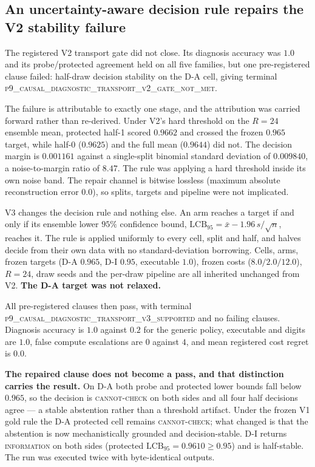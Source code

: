 \subsection{An uncertainty-aware decision rule repairs the V2 stability failure}
\label{sec:v3-transport}

The registered V2 transport gate did not close. Its diagnosis accuracy was
$1.0$ and its probe/protected agreement held on all five families, but one
pre-registered clause failed: half-draw decision stability on the D-A cell,
giving terminal \textsc{p9\_causal\_diagnostic\_transport\_v2\_gate\_not\_met}.

The failure is attributable to exactly one stage, and the attribution was carried
forward rather than re-derived. Under V2's hard threshold on the $R{=}24$ ensemble
mean, protected half-1 scored $0.9662$ and crossed the frozen $0.965$ target, while
half-0 ($0.9625$) and the full mean ($0.9644$) did not. The decision margin is
$0.001161$ against a single-split binomial standard deviation of $0.009840$, a
noise-to-margin ratio of $8.47$. The rule was applying a hard threshold inside its
own noise band. The repair channel is bitwise lossless (maximum absolute
reconstruction error $0.0$), so splits, targets and pipeline were not implicated.

V3 changes the decision rule and nothing else. An arm reaches a target if and only
if its ensemble lower $95\%$ confidence bound,
$\mathrm{LCB}_{95} = \bar{x} - 1.96\,s/\sqrt{n}$, reaches it. The rule is applied
uniformly to every cell, split and half, and halves decide from their own data with
no standard-deviation borrowing. Cells, arms, frozen targets (D-A $0.965$, D-I
$0.95$, executable $1.0$), frozen costs ($8.0/2.0/12.0$), $R{=}24$, draw seeds and
the per-draw pipeline are all inherited unchanged from V2. \textbf{The D-A target
was not relaxed.}

All pre-registered clauses then pass, with terminal
\textsc{p9\_causal\_diagnostic\_transport\_v3\_supported} and no failing clauses.
Diagnosis accuracy is $1.0$ against $0.2$ for the generic policy, executable and
digits are $1.0$, false compute escalations are $0$ against $4$, and mean registered
cost regret is $0.0$.

\textbf{The repaired clause does not become a pass, and that distinction carries the
result.} On D-A both probe and protected lower bounds fall below $0.965$, so the
decision is \textsc{cannot-check} on both sides and all four half decisions agree ---
a stable abstention rather than a threshold artifact. Under the frozen V1 gold rule
the D-A protected cell remains \textsc{cannot-check}; what changed is that the
abstention is now mechanistically grounded and decision-stable. D-I returns
\textsc{information} on both sides (protected $\mathrm{LCB}_{95} = 0.9610 \ge 0.95$)
and is half-stable. The run was executed twice with byte-identical outputs.

